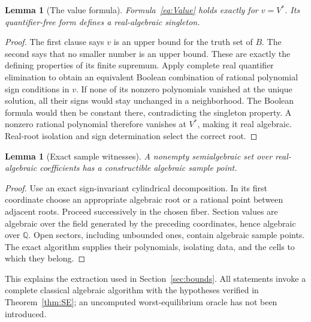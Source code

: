 \documentclass[11pt,a4paper]{article}
\numberwithin{equation}{section}
\newtheorem{lemma}[theorem]{Lemma}
\theoremstyle{definition}
\newcommand{\Q}{\mathbb Q}
\begin{document}
\begin{lemma}[The value formula]\label{lem:value}
Formula~\eqref{eq:Value} holds exactly for \(v=V^*\).
Its quantifier-free form defines a real-algebraic singleton.
\end{lemma}
\begin{proof}
The first clause says \(v\) is an upper bound for the truth set of
\(B\). The second says that no smaller number is an upper bound.
These are exactly the defining properties of its finite supremum.
Apply complete real quantifier elimination to obtain an equivalent
Boolean combination of rational polynomial sign conditions in \(v\).
If none of its nonzero polynomials vanished at the unique solution,
all their signs would stay unchanged in a neighborhood.
The Boolean formula would then be constant there, contradicting
the singleton property. A nonzero rational polynomial therefore
vanishes at \(V^*\), making it real algebraic.
Real-root isolation and sign determination select the correct root.
\end{proof}

\begin{lemma}[Exact sample witnesses]\label{lem:sample}
A nonempty semialgebraic set over real-algebraic coefficients has a
constructible algebraic sample point.
\end{lemma}
\begin{proof}
Use an exact sign-invariant cylindrical decomposition.
In its first coordinate choose an appropriate algebraic root or
a rational point between adjacent roots.
Proceed successively in the chosen fiber.
Section values are algebraic over the field generated by the
preceding coordinates, hence algebraic over \(\Q\).
Open sectors, including unbounded ones, contain algebraic sample
points. The exact algorithm supplies their polynomials, isolating
data, and the cells to which they belong.
\end{proof}
This explains the extraction used in Section~\ref{sec:bounds}.
All statements invoke a complete classical algebraic algorithm with
the hypotheses verified in Theorem~\ref{thm:SE}; an uncomputed
worst-equilibrium oracle has not been introduced.
\end{document}
